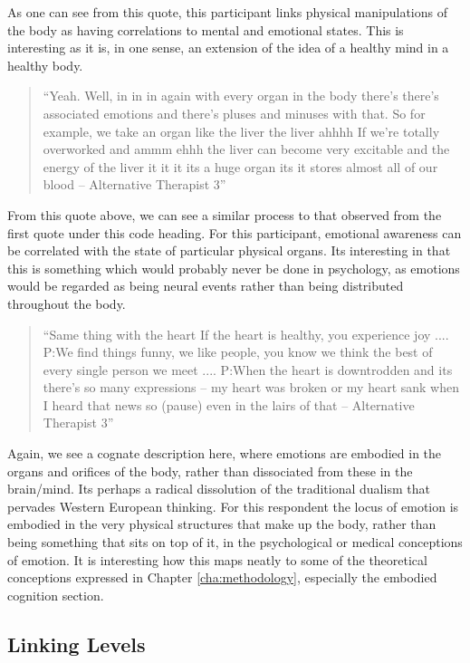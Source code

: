 As one can see from this quote, this participant links physical manipulations of the body as having correlations to mental and emotional states. This is interesting as it is, in one sense, an extension of the idea of a healthy mind in a healthy body. 


\begin{quotation}
``Yeah. Well, in in in again with every organ in the body there's there's associated emotions and there's pluses and minuses with that. So for example, we take an organ like the liver the liver ahhhh If we're totally overworked and ammm ehhh the liver can become very excitable and the energy of the liver it it it its a huge organ its it stores almost all of our blood – Alternative Therapist 3''  
\end{quotation}


From this quote above, we can see a similar process to that observed from the first quote under this code heading. For this participant, emotional awareness can be correlated with the state of particular physical organs. Its interesting in that this is something which would probably never be done in psychology, as emotions would be regarded as being neural events rather than being distributed throughout the body. 

\begin{quotation}
``Same thing with the heart If the heart is healthy, you experience joy 
....
P:We find things funny, we like people, you know we think the best of every single person we meet 
....
P:When the heart is downtrodden and its there's so many expressions – my heart was broken or my heart sank when I heard that news so (pause) even in the lairs of that – Alternative Therapist 3''  
\end{quotation}


Again, we see a cognate description here, where emotions are embodied in the organs and orifices of the body, rather than dissociated from these in the brain/mind. Its perhaps a radical dissolution of the traditional dualism that pervades Western European thinking. For this respondent the locus of emotion is embodied in the very physical structures that make up the body, rather than being something that sits on top of it, in the psychological or medical conceptions of emotion. It is interesting how this maps neatly to some of the theoretical conceptions expressed in Chapter \ref{cha:methodology}, especially the embodied cognition section. 

\subsection{Linking Levels}

